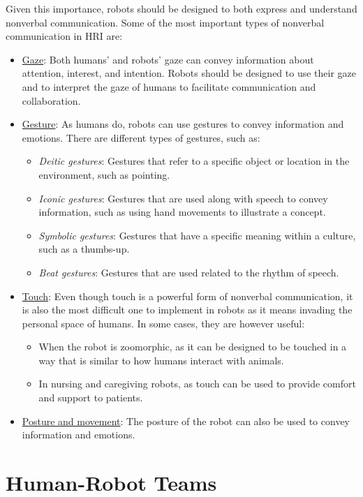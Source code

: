 Given this importance, robots should be designed to both express and understand nonverbal communication. Some of the most important types of nonverbal communication in HRI are:
\begin{itemize}
    \item \ul{Gaze}: Both humans' and robots' gaze can convey information about attention, interest, and intention. Robots should be designed to use their gaze and to interpret the gaze of humans to facilitate communication and collaboration.
    \item \ul{Gesture}: As humans do, robots can use gestures to convey information and emotions. There are different types of gestures, such as:
    \begin{itemize}
        \item \emph{Deitic gestures}: Gestures that refer to a specific object or location in the environment, such as pointing.
        \item \emph{Iconic gestures}: Gestures that are used along with speech to convey information, such as using hand movements to illustrate a concept.
        \item \emph{Symbolic gestures}: Gestures that have a specific meaning within a culture, such as a thumbs-up.
        \item \emph{Beat gestures}: Gestures that are used related to the rhythm of speech.
    \end{itemize}
    \item \ul{Touch}: Even though touch is a powerful form of nonverbal communication, it is also the most difficult one to implement in robots as it means invading the personal space of humans. In some cases, they are however useful:
    \begin{itemize}
        \item When the robot is zoomorphic, as it can be designed to be touched in a way that is similar to how humans interact with animals.
        \item In nursing and caregiving robots, as touch can be used to provide comfort and support to patients.
    \end{itemize}
    \item \ul{Posture and movement}: The posture of the robot can also be used to convey information and emotions.
\end{itemize}


\section{Human-Robot Teams}

